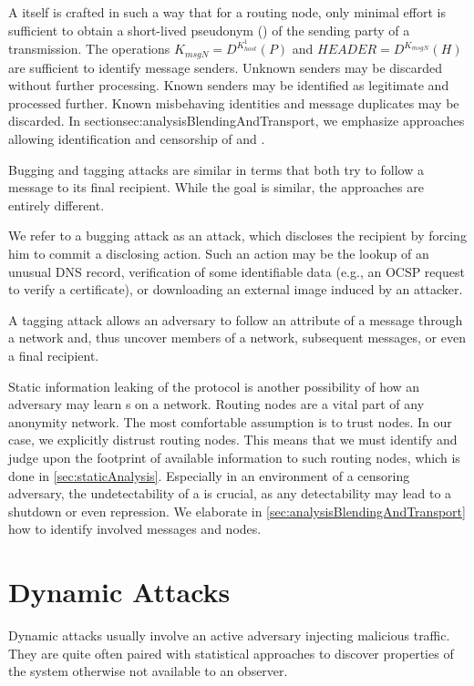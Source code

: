 A \VortexMessage{} itself is crafted in such a way that for a routing node, only minimal effort is sufficient to obtain a short-lived pseudonym () of the sending party of a transmission. The operations $ K_{msgN}=D^{K^{1}_{host}}\left(P\right)$ and $HEADER=D^{K_{msgN}}\left(H\right)$ are sufficient to identify message senders. Unknown senders may be discarded without further processing. Known senders may be identified as legitimate and processed further. Known misbehaving identities and message duplicates may be discarded. In section{sec:analysisBlendingAndTransport}, we emphasize approaches allowing identification and censorship of \VortexMessages{} and \VortexNodes.

Bugging and tagging attacks are similar in terms that both try to follow a message to its final recipient. While the goal is similar, the approaches are entirely different.

We refer to a bugging attack as an attack, which discloses the recipient by forcing him to commit a disclosing action. Such an action may be the lookup of an unusual DNS record, verification of some identifiable data (e.g., an OCSP request to verify a certificate), or downloading an external image induced by an attacker.

A tagging attack allows an adversary to follow an attribute of a message through a network and, thus uncover members of a network, subsequent messages, or even a final recipient.

Static information leaking of the protocol is another possibility of how an adversary may learn s on a network. Routing nodes are a vital part of any anonymity network. The most comfortable assumption is to trust nodes. In our case, we explicitly distrust routing nodes. This means that we must identify and judge upon the footprint of available information to such routing nodes, which is done in \cref{sec:staticAnalysis}. Especially in an environment of a censoring adversary, the undetectability of a \VortexNode{} is crucial, as any detectability may lead to a shutdown or even repression. We elaborate in \cref{sec:analysisBlendingAndTransport} how to identify involved messages and nodes.

\section{Dynamic Attacks}
Dynamic attacks usually involve an active adversary injecting malicious traffic. They are quite often paired with statistical approaches to discover properties of the system otherwise not available to an observer. 


